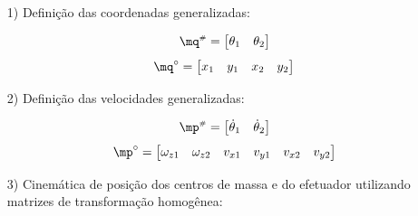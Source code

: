 \documentclass[a4paper,11pt,brazil,fleqn]{article}
\begin{document}
\begin{itemize}
\item[1)] Defini\c{c}\~ao das coordenadas generalizadas:

\begin{equation}
\mq\ssh = \begin{bmatrix}
\theta_1 & \theta_2
\end{bmatrix}
\end{equation}
\begin{equation}
\mq\cir = \begin{bmatrix}
x_1 & y_1 & x_2 & y_2
\end{bmatrix}
\end{equation}

\item[2)] Defini\c{c}\~ao das velocidades generalizadas:

\begin{equation}
\mp\ssh = \begin{bmatrix}
\dot{\theta}_1 & \dot{\theta}_2
\end{bmatrix}
\end{equation}
\begin{equation}
\mp\cir = \begin{bmatrix}
\omega_{z1} & \omega_{z2} & v_{x1} & v_{y1} & v_{x2} & v_{y2}
\end{bmatrix}
\end{equation}

\item[3)] Cinem\'atica de posi\c{c}\~ao dos centros de massa e do efetuador utilizando matrizes de transforma\c{c}\~ao homog\^enea:


\end{itemize}
\end{document}
